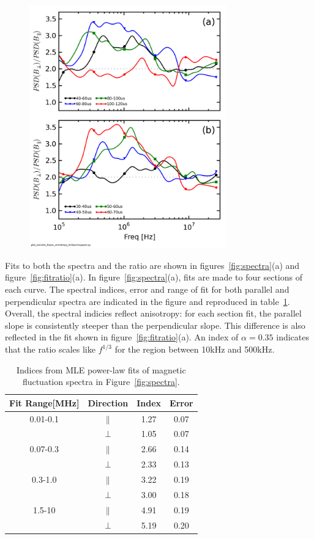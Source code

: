 \documentclass[aip,prl,amsmath,amssymb,reprint,superscriptaddress]{revtex4-1} %
\begin{document}
\begin{figure}[!htbp]
\centerline{
\includegraphics[width=8.5cm]{Bperppara_chan1t4_1mWbspectra_timescan}}
\caption{\label{fig:timeratio}}
\end{figure}

Fits to both the spectra and the ratio are shown in figures~\ref{fig:spectra}(a) and figure~\ref{fig:fitratio}(a). In figure~\ref{fig:spectra}(a), fits are made to four sections of each curve. The spectral indices, error and range of fit for both parallel and perpendicular spectra are indicated in the figure and reproduced in table~\ref{tab:Bindices}. Overall, the spectral indicies reflect anisotropy: for each section fit, the parallel slope is consistently steeper than the perpendicular slope. This difference is also reflected in the fit shown in figure~\ref{fig:fitratio}(a). An index of $\alpha = 0.35$ indicates that the ratio scales like $f^{1/3}$ for the region between 10kHz and 500kHz.

\begin{table}
\caption{\label{tab:Bindices}Indices from MLE power-law fits of magnetic fluctuation spectra in Figure~\ref{fig:spectra}.}
\begin{tabular}{cccc}
\toprule
Fit Range[MHz]	&	Direction		&	Index	&Error\\
\hline
0.01-0.1				& $\parallel$	& 1.27	&0.07\\
								& $\perp$			& 1.05  &0.07\\
\hline
0.07-0.3				& $\parallel$	& 2.66	&0.14\\
								& $\perp$			& 2.33  &0.13\\
\hline
0.3-1.0					& $\parallel$	& 3.22	&0.19\\
								& $\perp$			& 3.00  &0.18\\
\hline
1.5-10					& $\parallel$	& 4.91	&0.19\\
								& $\perp$			& 5.19  &0.20\\
\hline
\end{tabular}
\end{table}
\end{document}
